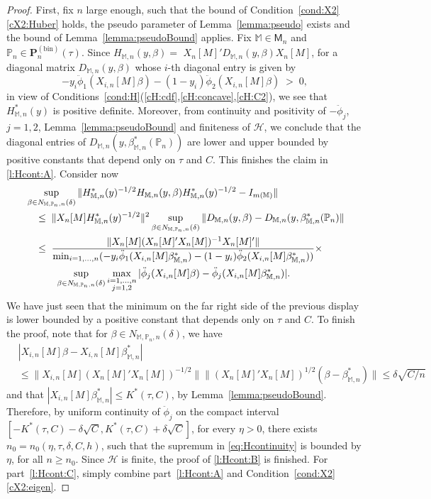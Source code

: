 \documentclass[preprint]{imsart}
\renewcommand{\P}{{\mathbb P}}
\newcommand{\M}{\mathbb M}
\numberwithin{equation}{section}
\begin{document}
\begin{proof}
First, fix $n$ large enough, such that the bound of Condition~\ref{cond:X2}\eqref{cX2:Huber} holds, the pseudo parameter of Lemma~\ref{lemma:pseudo} exists and the bound of Lemma~\ref{lemma:pseudoBound} applies. Fix $\M\in\mathsf{M}_n$ and $\P_n\in\mathbf{P}_n^{(\mathrm{bin})}(\tau)$. Since $H_{\M,n}(y,\beta) =$ \linebreak $X_n[M]'D_{\M,n}(y,\beta)X_n[M]$, for a diagonal matrix $D_{\M,n}(y,\beta)$ whose $i$-th diagonal entry is given by 
$$
-y_i\ddot{\phi}_1(X_{i,n}[M]\beta) - (1-y_i)\ddot{\phi}_2(X_{i,n}[M]\beta)\;>\;0,
$$
in view of Conditions~\ref{cond:H}(\ref{cH:cdf},\ref{cH:concave},\ref{cH:C2}), we see that $H_{\M,n}^*(y)$ is positive definite. Moreover, from continuity and positivity of $-\ddot{\phi}_j$, $j=1,2$, Lemma~\ref{lemma:pseudoBound} and finiteness of $\mathcal H$, we conclude that the diagonal entries of $D_{\M,n}(y,\beta_{\M,n}^*(\P_n))$ are lower and upper bounded by positive constants that depend only on $\tau$ and $C$. This finishes the claim in \ref{l:Hcont:A}. Consider now
\begin{align}
&\sup_{\beta\in N_{\M,\P_n,n}(\delta)} \|H_{\M,n}^*(y)^{-1/2} H_{\M,n}(y,\beta) H_{\M,n}^*(y)^{-1/2} - I_{m(\M)}\| \notag\\
&\quad\le\; 
\|X_n[M]H_{\M,n}^*(y)^{-1/2}\|^2 \sup_{\beta\in N_{\M,\P_n,n}(\delta)} \|D_{\M,n}(y,\beta)  - D_{\M,n}(y,\beta_{\M,n}^*(\P_n)\| \notag\\
&\quad\le\;
\frac{\|X_n[M](X_n[M]'X_n[M])^{-1}X_n[M]'\|}{\min_{i=1,\dots, n}(-y_i\ddot{\phi}_1(X_{i,n}[M]\beta_{\M,n}^*) - (1-y_i)\ddot{\phi}_2(X_{i,n}[M]\beta_{\M,n}^*))} \times\notag\\
&\quad\quad\quad
\sup_{\beta\in N_{\M,\P_n,n}(\delta)}\max_{\substack{i=1,\dots, n\\j=1,2}} |\ddot \phi_j(X_{i,n}[M]\beta) - \ddot \phi_j(X_{i,n}[M]\beta_{\M,n}^*)|. \label{eq:Hcontinuity}
\end{align}
We have just seen that the minimum on the far right side of the previous display is lower bounded by a positive constant that depends only on $\tau$ and $C$. To finish the proof, note that for $\beta\in N_{\M,\P_n,n}(\delta)$, we have 
\begin{align*}
&|X_{i,n}[M]\beta - X_{i,n}[M]\beta_{\M,n}^*| \\ &\le \|X_{i,n}[M](X_n[M]'X_n[M])^{-1/2}\| \|(X_n[M]'X_n[M])^{1/2}(\beta - \beta_{\M,n}^*)\|\le \delta \sqrt{C/n}
\end{align*} 
and that $|X_{i,n}[M]\beta_{\M,n}^*|\le K^*(\tau,C)$, by Lemma~\ref{lemma:pseudoBound}. Therefore, by uniform continuity of $\ddot{\phi}_j$ on the compact interval $[-K^*(\tau,C) - \delta \sqrt{C}, K^*(\tau,C) + \delta \sqrt{C}]$, for every $\eta>0$, there exists $n_0 = n_0(\eta, \tau, \delta, C,h)$, such that the supremum in \eqref{eq:Hcontinuity} is bounded by $\eta$, for all $n\ge n_0$. Since $\mathcal H$ is finite, the proof of \ref{l:Hcont:B} is finished. 
For part~\ref{l:Hcont:C}, simply combine part~\ref{l:Hcont:A} and Condition~\ref{cond:X2}\eqref{cX2:eigen}.
\end{proof}
\end{document}
